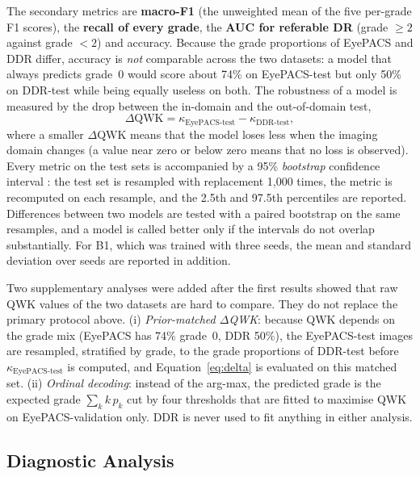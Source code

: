 The secondary metrics are \textbf{macro-F1} (the unweighted mean of the five per-grade F1 scores), the \textbf{recall of every grade}, the \textbf{AUC for referable DR} (grade $\ge 2$ against grade $<2$) and accuracy. Because the grade proportions of EyePACS and DDR differ, accuracy is \emph{not} comparable across the two datasets: a model that always predicts grade~0 would score about 74\% on EyePACS-test but only 50\% on DDR-test while being equally useless on both. The robustness of a model is measured by the drop between the in-domain and the out-of-domain test,
\begin{equation}
    \Delta\text{QWK} = \kappa_{\text{EyePACS-test}} - \kappa_{\text{DDR-test}},
    \label{eq:delta}
\end{equation}
where a smaller $\Delta\text{QWK}$ means that the model loses less when the imaging domain changes (a value near zero or below zero means that no loss is observed). Every metric on the test sets is accompanied by a 95\% \emph{bootstrap} confidence interval \cite{efron1993}: the test set is resampled with replacement 1{,}000 times, the metric is recomputed on each resample, and the 2.5th and 97.5th percentiles are reported. Differences between two models are tested with a paired bootstrap on the same resamples, and a model is called better only if the intervals do not overlap substantially. For B1, which was trained with three seeds, the mean and standard deviation over seeds are reported in addition.

Two supplementary analyses were added after the first results showed that raw QWK values of the two datasets are hard to compare. They do not replace the primary protocol above. (i) \emph{Prior-matched $\Delta$QWK}: because QWK depends on the grade mix (EyePACS has 74\% grade~0, DDR 50\%), the EyePACS-test images are resampled, stratified by grade, to the grade proportions of DDR-test before $\kappa_{\text{EyePACS-test}}$ is computed, and Equation~\eqref{eq:delta} is evaluated on this matched set. (ii) \emph{Ordinal decoding}: instead of the arg-max, the predicted grade is the expected grade $\sum_k k\,p_k$ cut by four thresholds that are fitted to maximise QWK on EyePACS-validation only. DDR is never used to fit anything in either analysis.

\subsection{Diagnostic Analysis}
\label{subsec:diagnostics}

